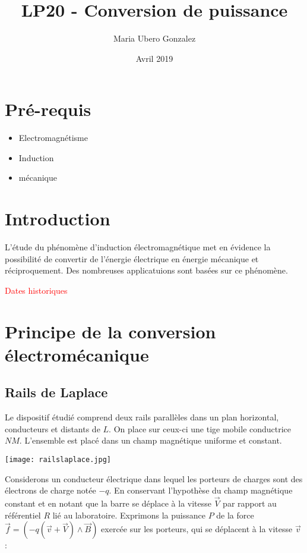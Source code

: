 \documentclass{article}
\title{LP20 - Conversion de puissance}
\author{Maria Ubero Gonzalez}
\date{Avril 2019}
\begin{document}
\maketitle

\section*{Pré-requis}
\begin{itemize}
    \item Electromagnétisme 
    \item Induction
    \item mécanique
\end{itemize}



\section*{Introduction}
L'étude du phénomène d'induction électromagnétique met en évidence la possibilité de convertir de l'énergie électrique en énergie mécanique et réciproquement. Des nombreuses applicatuions sont basées sur ce phénomène.\medskip

\textcolor{red}{Dates historiques}

\section{Principe de la conversion électromécanique}



\subsection{Rails de Laplace}

Le dispositif étudié  comprend deux rails parallèles dans un plan horizontal, conducteurs et distants de $L$. On place sur ceux-ci une tige mobile conductrice $NM$. L'ensemble est placé dans un champ magnétique uniforme et constant.

\begin{center}
    \texttt{[image: railslaplace.jpg]}
\end{center}

Considerons un conducteur électrique dans lequel les porteurs de charges sont des électrons de charge notée $-q$. En conservant l'hypothèse du champ magnétique constant et en notant que la barre se déplace à la vitesse $\vec{V}$ par rapport au référentiel $R$ lié au laboratoire. Exprimons la puissance $P$ de la force $\vec{f}=(-q(\vec{v} + \vec{V}) \land \vec{B})$ exercée sur les porteurs, qui se déplacent à la vitesse $\vec{v}$ :
\end{document}
